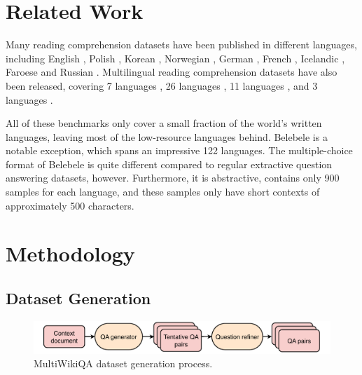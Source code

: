 \documentclass[10pt, a4paper]{article}
\begin{document}
\section{Related Work}
Many reading comprehension datasets have been published in different languages, including English , Polish , Korean , Norwegian , German , French , Icelandic , Faroese  and Russian . Multilingual reading comprehension datasets have also been released, covering 7 languages , 26 languages , 11 languages , and 3 languages .

All of these benchmarks only cover a small fraction of the world's written languages, leaving most of the low-resource languages behind. Belebele  is a notable exception, which spans an impressive 122 languages. The multiple-choice format of Belebele is quite different compared to regular extractive question answering datasets, however. Furthermore, it is abstractive, contains only 900 samples for each language, and these samples only have short contexts of approximately 500 characters.


\section{Methodology}
\label{sec:methodology}


\subsection{Dataset Generation}
\label{sec:dataset-generation}

\begin{figure}[h]
    \centering
    \includegraphics[width=0.9\linewidth]{multi-wiki-qa-process.drawio.pdf}
    \caption{MultiWikiQA dataset generation process.}
    \label{fig:dataset-generation}
\end{figure}
\end{document}
